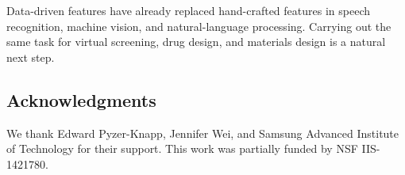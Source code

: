 \documentclass{article}
\begin{document}
Data-driven features have already replaced hand-crafted features in speech recognition, machine vision, and natural-language processing.
Carrying out the same task for virtual screening, drug design, and materials design is a natural next step.

\subsection*{Acknowledgments}
We thank Edward Pyzer-Knapp, Jennifer Wei, and Samsung Advanced Institute of Technology for their support.
This work was partially funded by NSF IIS-1421780.



\end{document}

